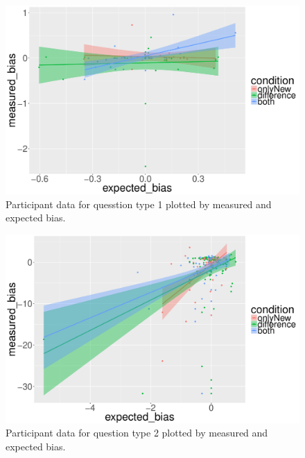 \documentclass[10pt,journal,compsoc]{IEEEtran}
\begin{document}
\begin{figure}[!t]
  \centering
  \includegraphics[width=\columnwidth]{how_many_precise.pdf}
  \caption{Participant data for quesstion type 1 plotted by measured and expected bias.}
  \label{figure_q1}
\end{figure}

\begin{figure}[!t]
  \centering
  \includegraphics[width=\columnwidth]{compare_precise.pdf}
  \caption{Participant data for question type 2 plotted by measured and expected bias.}
  \label{figure_q2}
\end{figure}
\end{document}
